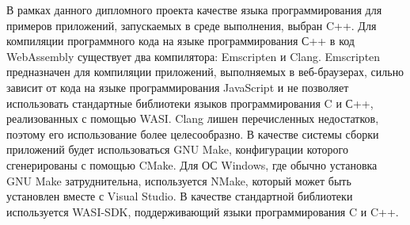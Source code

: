 В рамках данного дипломного проекта качестве языка программирования для примеров приложений, запускаемых в среде выполнения, выбран C++.
Для компиляции программного кода на языке программирования С++ в код WebAssembly существует два компилятора: Emscripten и Clang. 
Emscripten предназначен для компиляции приложений, выполняемых в веб-браузерах, сильно зависит от кода на языке программирования JavaScript и не позволяет использовать стандартные библиотеки языков программирования C и С++, реализованных с помощью WASI.
Clang лишен перечисленных недостатков, поэтому его использование более целесообразно.
В качестве системы сборки приложений будет использоваться GNU Make, конфигурации которого сгенерированы с помощью CMake.
Для ОС Windows, где обычно установка GNU Make затруднительна, используется NMake, который может быть установлен вместе с Visual Studio.
В качестве стандартной библиотеки используется WASI-SDK, поддерживающий языки программирования C и C++.